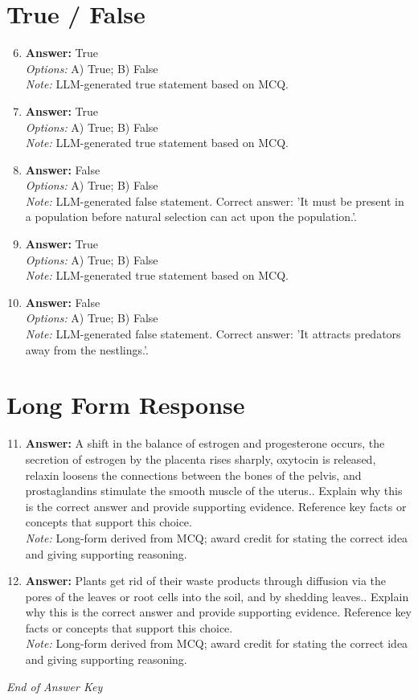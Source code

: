 \documentclass[12pt]{article}
\begin{document}
\section*{True / False}
\begin{enumerate}[label=\arabic*.]
\setcounter{enumi}{5}
\item \textbf{Answer:} True
\\ \textit{Options:} A) True; B) False
\\ \textit{Note:} LLM-generated true statement based on MCQ.
\item \textbf{Answer:} True
\\ \textit{Options:} A) True; B) False
\\ \textit{Note:} LLM-generated true statement based on MCQ.
\item \textbf{Answer:} False
\\ \textit{Options:} A) True; B) False
\\ \textit{Note:} LLM-generated false statement. Correct answer: 'It must be present in a population before natural selection can act upon the population.'.
\item \textbf{Answer:} True
\\ \textit{Options:} A) True; B) False
\\ \textit{Note:} LLM-generated true statement based on MCQ.
\item \textbf{Answer:} False
\\ \textit{Options:} A) True; B) False
\\ \textit{Note:} LLM-generated false statement. Correct answer: 'It attracts predators away from the nestlings.'.
\end{enumerate}

\section*{Long Form Response}
\begin{enumerate}[label=\arabic*.]
\setcounter{enumi}{10}
\item \textbf{Answer:} A shift in the balance of estrogen and progesterone occurs, the secretion of estrogen by the placenta rises sharply, oxytocin is released, relaxin loosens the connections between the bones of the pelvis, and prostaglandins stimulate the smooth muscle of the uterus.. Explain why this is the correct answer and provide supporting evidence. Reference key facts or concepts that support this choice.
\\ \textit{Note:} Long-form derived from MCQ; award credit for stating the correct idea and giving supporting reasoning.
\item \textbf{Answer:} Plants get rid of their waste products through diffusion via the pores of the leaves or root cells into the soil, and by shedding leaves.. Explain why this is the correct answer and provide supporting evidence. Reference key facts or concepts that support this choice.
\\ \textit{Note:} Long-form derived from MCQ; award credit for stating the correct idea and giving supporting reasoning.
\end{enumerate}

\vfill
\noindent\textit{End of Answer Key}
\end{document}
